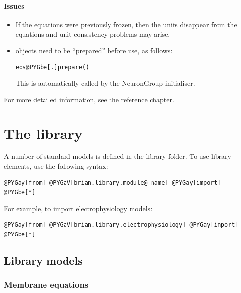 \documentclass[letterpaper,10pt,english]{manual}
\begin{document}
\subsubsection{Issues}
\begin{itemize}
\item {} 
If the equations were previously frozen, then the units disappear from the equations
and unit consistency problems may arise.

\item {} 
\hyperlink{brian.Equations}{} objects need to be ``prepared'' before use, as follows:

\begin{Verbatim}[commandchars=@\[\]]
eqs@PYGbe[.]prepare()
\end{Verbatim}

This is automatically called by the NeuronGroup initialiser.

\end{itemize}

For more detailed information, see the reference chapter.

\resetcurrentobjects


\chapter{The library}

A number of standard models is defined in the library folder. To use library elements, use the following syntax:

\begin{Verbatim}[commandchars=@\[\]]
@PYGay[from] @PYGaV[brian.library.module@_name] @PYGay[import] @PYGbe[*]
\end{Verbatim}

For example, to import electrophysiology models:

\begin{Verbatim}[commandchars=@\[\]]
@PYGay[from] @PYGaV[brian.library.electrophysiology] @PYGay[import] @PYGbe[*]
\end{Verbatim}

\resetcurrentobjects


\section{Library models}


\subsection{Membrane equations}
\end{document}
